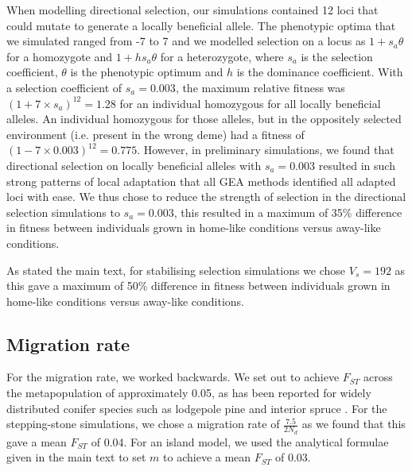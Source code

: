\documentclass[10pt,twoside,lineno, twocolumn]{GSA_format}
\begin{document}
When modelling directional selection, our simulations contained 12 loci that could mutate to generate a locally beneficial allele. The phenotypic optima that we simulated ranged from -7 to 7 and we modelled selection on a locus as $1 + s_a\theta$ for a homozygote and $1 + hs_a\theta$ for a heterozygote, where $s_a$ is the selection coefficient, $\theta$ is the phenotypic optimum and $h$ is the dominance coefficient. With a selection coefficient of $s_a = 0.003$, the maximum relative fitness was $(1+7\times s_a)^{12} = 1.28$ for an individual homozygous for all locally beneficial alleles. An individual homozygous for those alleles, but in the oppositely selected environment (i.e. present in the wrong deme) had a fitness of $(1-7\times 0.003)^{12} = 0.775$. However, in preliminary simulations, we found that directional selection on locally beneficial alleles with $s_a = 0.003$ resulted in such strong patterns of local adaptation that all GEA methods identified all adapted loci with ease. We thus chose to reduce the strength of selection in the directional selection simulations to $s_a = 0.003$, this resulted in a maximum of 35\% difference in fitness between individuals grown in home-like conditions versus away-like conditions.

As stated the main text, for stabilising selection simulations we chose $V_s = 192$ as this gave a maximum of 50\% difference in fitness between individuals grown in home-like conditions versus away-like conditions.

\subsection{Migration rate} 
For the migration rate, we worked backwards. We set out to achieve $F_{ST}$ across the metapopulation of approximately 0.05, as has been reported for widely distributed conifer species such as lodgepole pine and interior spruce \citep{Yeaman2016}. For the stepping-stone simulations, we chose a migration rate of $\frac{7.5}{2N_d}$ as we found that this gave a mean $F_{ST}$ of 0.04. For an island model, we used the analytical formulae given in the main text to set $m$ to achieve a mean $F_{ST}$ of 0.03. 

\pagebreak
\end{document}
